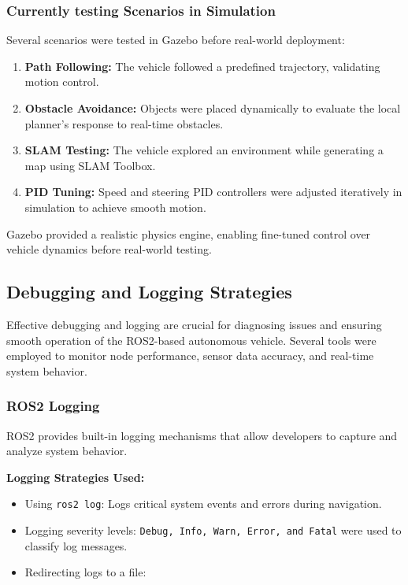 \documentclass[english,project]{buwthesis}
\begin{document}
\subsubsection{Currently testing Scenarios in Simulation}
Several scenarios were tested in Gazebo before real-world deployment:
\begin{enumerate}
    \item \textbf{Path Following:} The vehicle followed a predefined trajectory, validating motion control.
    \item \textbf{Obstacle Avoidance:} Objects were placed dynamically to evaluate the local planner's response to real-time obstacles.
    \item \textbf{SLAM Testing:} The vehicle explored an environment while generating a map using SLAM Toolbox.
    \item \textbf{PID Tuning:} Speed and steering PID controllers were adjusted iteratively in simulation to achieve smooth motion.
\end{enumerate}
Gazebo provided a realistic physics engine, enabling fine-tuned control over vehicle dynamics before real-world testing.


\subsection{Debugging and Logging Strategies}
Effective debugging and logging are crucial for diagnosing issues and ensuring smooth operation of the ROS2-based autonomous vehicle. Several tools were employed to monitor node performance, sensor data accuracy, and real-time system behavior.

\subsubsection{ROS2 Logging}
ROS2 provides built-in logging mechanisms that allow developers to capture and analyze system behavior.

\textbf{Logging Strategies Used:}
\begin{itemize}
    \item Using \texttt{ros2 log}: Logs critical system events and errors during navigation.
    \item Logging severity levels: \texttt{Debug, Info, Warn, Error, and Fatal} were used to classify log messages.
    \item Redirecting logs to a file: 
    \texttt{}
\end{itemize}
\end{document}
